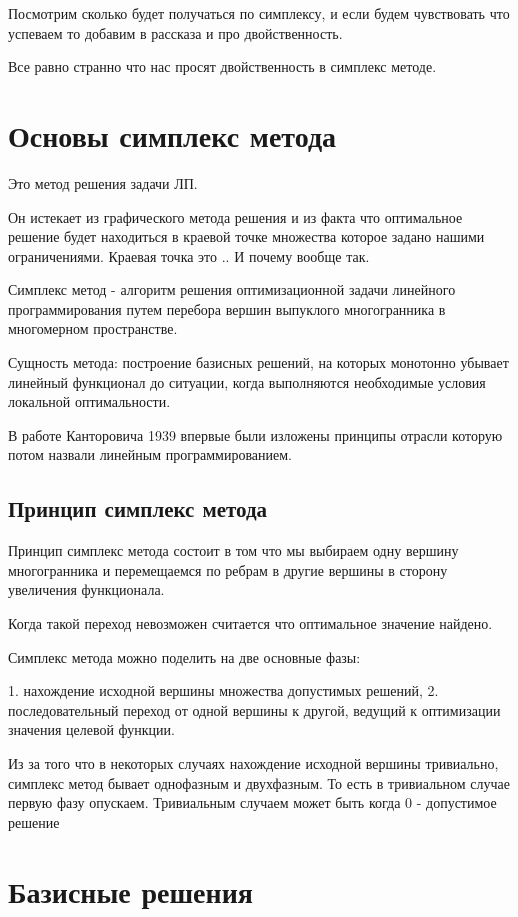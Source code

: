\documentclass[a4paper,article,14pt]{extarticle}
\begin{document}
Посмотрим сколько будет получаться по симплексу, и если будем чувствовать что успеваем то добавим в рассказа и про двойственность.

Все равно странно что нас просят двойственность в симплекс методе.

\section{Основы симплекс метода}

Это метод решения задачи ЛП.

Он истекает из графического метода решения и из факта что оптимальное решение будет находиться в краевой точке множества которое задано нашими ограничениями.
Краевая точка это ..
И почему вообще так.

Симплекс метод - алгоритм решения оптимизационной задачи линейного программирования путем перебора вершин выпуклого многогранника в многомерном пространстве.

Сущность метода: построение базисных решений, на которых монотонно убывает линейный функционал до ситуации, когда выполняются необходимые условия локальной оптимальности.

В работе Канторовича 1939 впервые были изложены принципы отрасли которую потом назвали линейным программированием.

\subsection{Принцип симплекс метода}

Принцип симплекс метода состоит в том что мы выбираем одну вершину многогранника и перемещаемся по ребрам в другие вершины в сторону увеличения функционала.

Когда такой переход невозможен считается что оптимальное значение найдено.

Симплекс метода можно поделить на две основные фазы:

1. нахождение исходной вершины множества допустимых решений,
2. последовательный переход от одной вершины к другой, ведущий к оптимизации значения целевой функции.

Из за того что в некоторых случаях нахождение исходной вершины тривиально, симплекс метод бывает однофазным и двухфазным.
То есть в тривиальном случае первую фазу опускаем.
Тривиальным случаем может быть когда 0 - допустимое решение

\section{Базисные решения}
\end{document}
